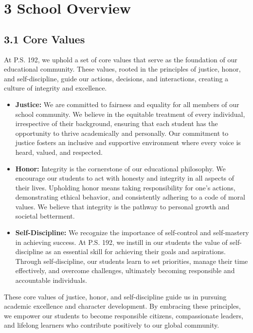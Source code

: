 \documentclass[11pt]{article}
\begin{document}
\section{3 School Overview}
\label{sec:org2f210c9}

\subsection{3.1 Core Values}
\label{sec:org3037419}

At P.S. 192, we uphold a set of core values that serve as the foundation of our educational community. These values, rooted in the principles of justice, honor, and self-discipline, guide our actions, decisions, and interactions, creating a culture of integrity and excellence.

\begin{itemize}
\item \textbf{\textbf{Justice:}} We are committed to fairness and equality for all members of our school community. We believe in the equitable treatment of every individual, irrespective of their background, ensuring that each student has the opportunity to thrive academically and personally. Our commitment to justice fosters an inclusive and supportive environment where every voice is heard, valued, and respected.

\item \textbf{\textbf{Honor:}} Integrity is the cornerstone of our educational philosophy. We encourage our students to act with honesty and integrity in all aspects of their lives. Upholding honor means taking responsibility for one’s actions, demonstrating ethical behavior, and consistently adhering to a code of moral values. We believe that integrity is the pathway to personal growth and societal betterment.

\item \textbf{\textbf{Self-Discipline:}} We recognize the importance of self-control and self-mastery in achieving success. At P.S. 192, we instill in our students the value of self-discipline as an essential skill for achieving their goals and aspirations. Through self-discipline, our students learn to set priorities, manage their time effectively, and overcome challenges, ultimately becoming responsible and accountable individuals.
\end{itemize}

These core values of justice, honor, and self-discipline guide us in pursuing academic excellence and character development. By embracing these principles, we empower our students to become responsible citizens, compassionate leaders, and lifelong learners who contribute positively to our global community.
\end{document}
